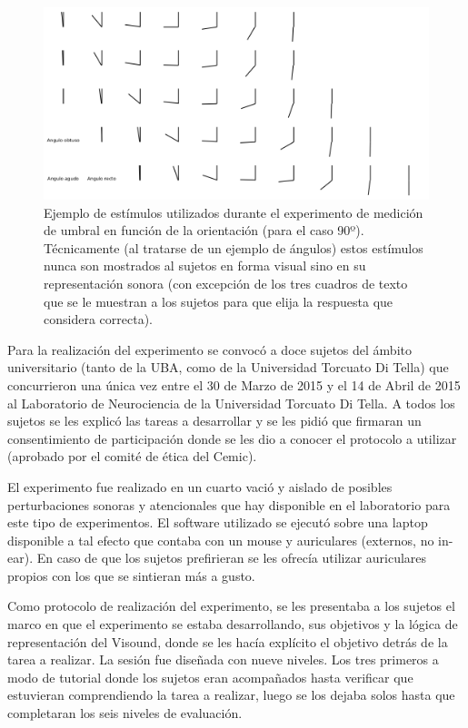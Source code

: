 \documentclass{article}
\numberwithin{figure}{section}
\begin{document}
    \begin{figure}
        \center
        \includegraphics[width=\textwidth]{Imagenes/ImagenesExp1_2.png}
        \caption{Ejemplo de estímulos utilizados durante el experimento de medición de umbral en función de la orientación (para el caso 90º). Técnicamente (al tratarse de un ejemplo de ángulos) estos estímulos nunca son mostrados al sujetos en forma visual sino en su representación sonora (con excepción de los tres cuadros de texto que se le muestran a los sujetos para que elija la respuesta que considera correcta).}
        \label{fig:ImagenesExp1}
    \end{figure}  
    
    Para la realización del experimento se convocó a doce sujetos del ámbito universitario (tanto de la UBA, como de la Universidad Torcuato Di Tella) que concurrieron una única vez entre el 30 de Marzo de 2015 y el 14 de Abril de 2015 al Laboratorio de Neurociencia de la Universidad Torcuato Di Tella. A todos los sujetos se les explicó las tareas a desarrollar y se les pidió que firmaran un consentimiento de participación donde se les dio a conocer el protocolo a utilizar (aprobado por el comité de ética del Cemic). 
    
    El experimento fue realizado en un cuarto vació y aislado de posibles perturbaciones sonoras y atencionales que hay disponible en el laboratorio para este tipo de experimentos. El software utilizado se ejecutó sobre una laptop disponible a tal efecto que contaba con un mouse y auriculares (externos, no in-ear). En caso de que los sujetos prefirieran se les ofrecía utilizar auriculares propios con los que se sintieran más a gusto.
    
    Como protocolo de realización del experimento, se les presentaba a los sujetos el marco en que el experimento se estaba desarrollando, sus objetivos y la lógica de representación del Visound, donde se les hacía explícito el objetivo detrás de la tarea a realizar. La sesión fue diseñada con nueve niveles. Los tres primeros a modo de tutorial donde los sujetos eran acompañados hasta verificar que estuvieran comprendiendo la tarea a realizar, luego se los dejaba solos hasta que completaran los seis niveles de evaluación. 
    
\end{document}
